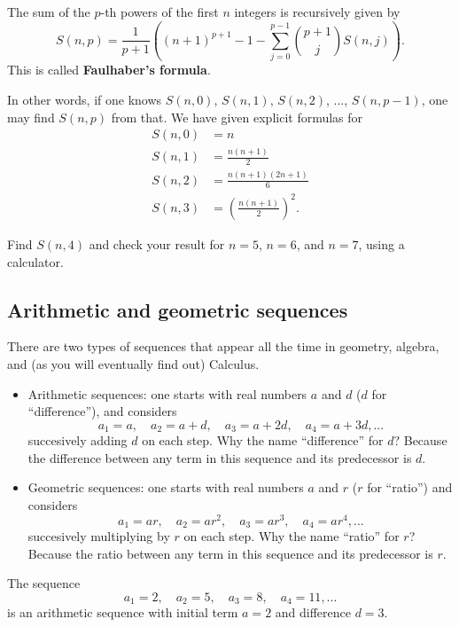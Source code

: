 \documentclass[nooutcomes]{ximera}
\begin{document}
\begin{callout}
  The sum of the $p$-th powers of the first $n$ integers is recursively given by $$S(n,p) = \frac{1}{p+1} \left((n+1)^{p+1} - 1 -\sum_{j=0}^{p-1} {{p+1}\choose j}S(n,j)\right).$$This is called {\bf Faulhaber's formula}.
\end{callout}
In other words, if one knows $S(n,0)$, $S(n,1)$, $S(n,2)$, ..., $S(n,p-1)$, one may find $S(n,p)$ from that. We have given explicit formulas for
\begin{align*}
  S(n,0) &= n \\ S(n,1) &= \frac{n(n+1)}{2} \\ S(n,2) &= \frac{n(n+1)(2n+1)}{6} \\ S(n,3) &= \left(\frac{n(n+1)}{2}\right)^2.
\end{align*}

\begin{exploration}
  Find $S(n,4)$ and check your result for $n=5$, $n=6$, and $n=7$, using a calculator.
\end{exploration}

\subsection{Arithmetic and geometric sequences}

There are two types of sequences that appear all the time in geometry, algebra, and (as you will eventually find out) Calculus.

\begin{itemize}
\item Arithmetic sequences: one starts with real numbers $a$ and $d$ ($d$ for ``difference''), and considers $$a_1 = a, \quad a_2 = a+d, \quad a_3 = a+2d, \quad a_4 = a+3d,...$$succesively adding $d$ on each step. Why the name ``difference'' for $d$? Because the difference between any term in this sequence and its predecessor is $d$.
\item Geometric sequences: one starts with real numbers $a$ and $r$ ($r$ for ``ratio'') and considers $$a_1 = ar, \quad a_2 = ar^2, \quad a_3 = ar^3, \quad a_4 = ar^4,...$$succesively multiplying by $r$ on each step. Why the name ``ratio'' for $r$? Because the ratio between any term in this sequence and its predecessor is $r$.
\end{itemize}

\begin{example}
  The sequence $$a_1 = 2, \quad a_2 = 5, \quad a_3 = 8, \quad a_4 = 11,...$$is an arithmetic sequence with initial term $a=2$ and difference $d=3$.
\end{example}
\end{document}
